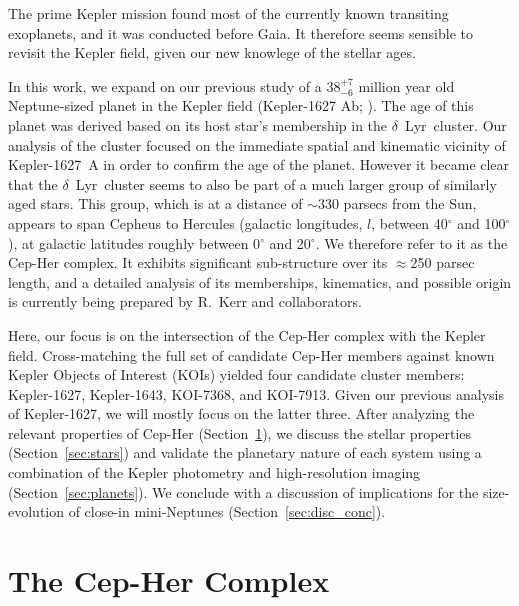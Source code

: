 \documentclass[12pt,twocolumn,linenumbers]{aastex63}
\begin{document}
The prime Kepler mission \citep{borucki_kepler_2010} found most of the
currently known transiting exoplanets, and it was conducted before
Gaia.  It therefore seems sensible to revisit the Kepler field, given
our new knowlege of the stellar ages.

In this work, we expand on our previous study of a $38^{+7}_{-6}$
million year old Neptune-sized planet in the Kepler field (Kepler-1627
Ab; \citealt{bouma_kep1627_2022}).  The age of this planet was derived
based on its host star's membership in the $\delta$\ Lyr\ cluster.
Our analysis of the cluster focused on the immediate spatial and
kinematic vicinity of Kepler-1627~A in order to confirm the age of the
planet.  However it became clear that the $\delta$\ Lyr\ cluster seems
to also be part of a much larger group of similarly aged stars.  This
group, which is at a distance of $\sim$330 parsecs from the Sun,
appears to span Cepheus to Hercules (galactic longitudes, $l$, between
40$^\circ$ and 100$^\circ$), at galactic latitudes roughly between
0$^\circ$ and 20$^\circ$.  We therefore refer to it as the Cep-Her
complex.  It exhibits significant sub-structure over its $\approx$250
parsec length, and a detailed analysis of its memberships, kinematics,
and possible origin is currently being prepared by R.~Kerr and
collaborators.

Here, our focus is on the intersection of the Cep-Her complex with the
Kepler field.  Cross-matching the full set of candidate Cep-Her
members against known Kepler Objects of Interest (KOIs)
\citep{thompson_planetary_2018} yielded four candidate cluster
members: Kepler-1627, Kepler-1643, KOI-7368, and KOI-7913.  Given our
previous analysis of Kepler-1627, we will mostly focus on the latter
three.  After analyzing the relevant properties of Cep-Her
(Section~\ref{sec:cluster}), we discuss the stellar properties
(Section~\ref{sec:stars}) and validate the planetary nature of each
system using a combination of the Kepler photometry and
high-resolution imaging (Section~\ref{sec:planets}).  We conclude with
a discussion of implications for the size-evolution of close-in
mini-Neptunes (Section~\ref{sec:disc_conc}).

\section{The Cep-Her Complex}
\label{sec:cluster}
\end{document}
